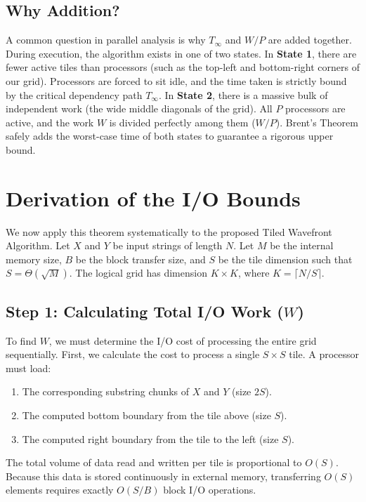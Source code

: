 \subsection{Why Addition?}
A common question in parallel analysis is why $T_\infty$ and $W/P$ are added together. During execution, the algorithm exists in one of two states. In \textbf{State 1}, there are fewer active tiles than processors (such as the top-left and bottom-right corners of our grid). Processors are forced to sit idle, and the time taken is strictly bound by the critical dependency path $T_\infty$. In \textbf{State 2}, there is a massive bulk of independent work (the wide middle diagonals of the grid). All $P$ processors are active, and the work $W$ is divided perfectly among them ($W/P$). Brent's Theorem safely adds the worst-case time of both states to guarantee a rigorous upper bound.

\section{Derivation of the I/O Bounds}
We now apply this theorem systematically to the proposed Tiled Wavefront Algorithm. Let $X$ and $Y$ be input strings of length $N$. Let $M$ be the internal memory size, $B$ be the block transfer size, and $S$ be the tile dimension such that $S = \Theta(\sqrt{M})$. The logical grid has dimension $K \times K$, where $K = \lceil N/S \rceil$.

\subsection{Step 1: Calculating Total I/O Work ($W$)}
To find $W$, we must determine the I/O cost of processing the entire grid sequentially. 
First, we calculate the cost to process a single $S \times S$ tile. A processor must load:
\begin{enumerate}
    \item The corresponding substring chunks of $X$ and $Y$ (size $2S$).
    \item The computed bottom boundary from the tile above (size $S$).
    \item The computed right boundary from the tile to the left (size $S$).
\end{enumerate}
The total volume of data read and written per tile is proportional to $O(S)$. Because this data is stored continuously in external memory, transferring $O(S)$ elements requires exactly $O(S/B)$ block I/O operations.

